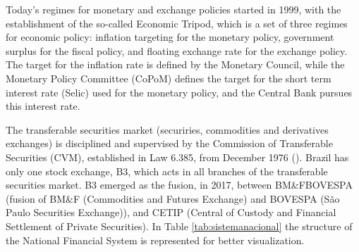 \documentclass[cic,tc, english]{iiufrgs}
\begin{document}
    Today's regimes for monetary and exchange policies started in 1999, with the establishment of the so-called Economic Tripod, which is a set of three regimes for economic policy: inflation targeting for the monetary policy, government surplus for the fiscal policy, and floating exchange rate for the exchange policy. The target for the inflation rate is defined by the Monetary Council, while the Monetary Policy Committee (CoPoM) defines the target for the short term interest rate (Selic) used for the monetary policy, and the Central Bank pursues this interest rate.

    The transferable securities market (securiries, commodities and derivatives exchanges) is disciplined and supervised by the Commission of Transferable Securities (CVM), established in Law 6.385, from December 1976 (\citet{lei6385}). Brazil has only one stock exchange, B3, which acts in all branches of the transferable securities market. B3 emerged as the fusion, in 2017, between BM\&FBOVESPA (fusion of BM\&F (Commodities and Futures Exchange) and BOVESPA (São Paulo Securities Exchange)), and CETIP (Central of Custody and Financial Settlement of Private Securities).  In Table \ref{tab:sistemanacional} the structure of the National Financial System is represented for better visualization.
\end{document}
